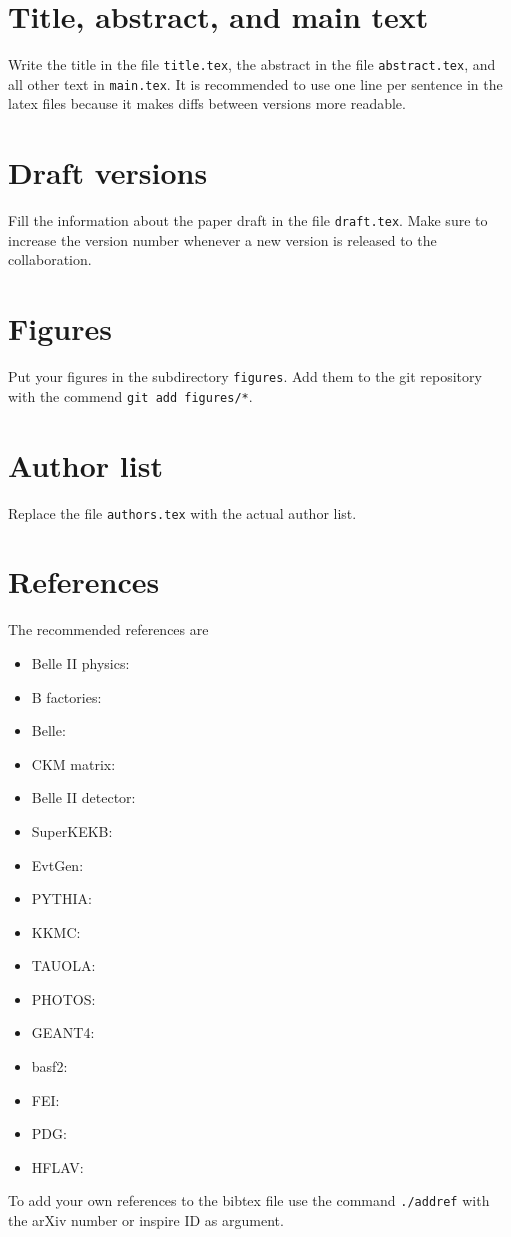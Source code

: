 
\section{Title, abstract, and main text}
Write the title in the file \texttt{title.tex}, the abstract in the file \texttt{abstract.tex}, and all other text in \texttt{main.tex}.
It is recommended to use one line per sentence in the latex files because it makes diffs between versions more readable.

\section{Draft versions}
Fill the information about the paper draft in the file \texttt{draft.tex}.
Make sure to increase the version number whenever a new version is released to the collaboration.

\section{Figures}
Put your figures in the subdirectory \texttt{figures}.
Add them to the git repository with the commend \texttt{git add figures/*}.

\section{Author list}
Replace the file \texttt{authors.tex} with the actual author list.

\section{References}
The recommended references are
\begin{itemize}
\item Belle II physics: \cite{Kou:2018nap}
\item B factories: \cite{Bevan:2014iga}
\item Belle: \cite{Brodzicka:2012jm}
\item CKM matrix: \cite{Kobayashi:1973fv}
\item Belle II detector: \cite{Abe:2010gxa}
\item SuperKEKB: \cite{Akai:2018mbz}
\item EvtGen: \cite{Lange:2001uf}
\item PYTHIA: \cite{Sjostrand:2014zea}
\item KKMC: \cite{Jadach:1999vf}
\item TAUOLA: \cite{Jadach:1990mz}
\item PHOTOS: \cite{Barberio:1990ms}
\item GEANT4: \cite{Agostinelli:2002hh}
\item basf2: \cite{Kuhr:2018lps}
\item FEI: \cite{Keck:2018lcd}
\item PDG: \cite{Zyla:2020zbs}
\item HFLAV: \cite{Amhis:2019ckw}
\end{itemize}
To add your own references to the bibtex file use the command \texttt{./addref} with the arXiv number or inspire ID as argument.

